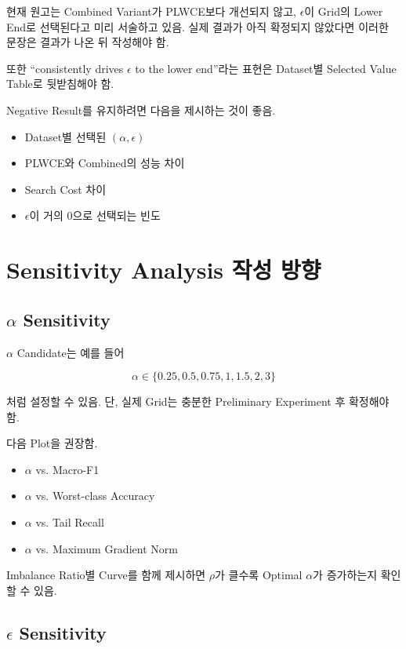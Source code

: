 \documentclass[11pt,a4paper]{article}
\begin{document}
현재 원고는 Combined Variant가 PLWCE보다 개선되지 않고, \(\epsilon\)이 Grid의 Lower End로 선택된다고 미리 서술하고 있음. 실제 결과가 아직 확정되지 않았다면 이러한 문장은 결과가 나온 뒤 작성해야 함.

또한 ``consistently drives \(\epsilon\) to the lower end''라는 표현은 Dataset별 Selected Value Table로 뒷받침해야 함.

Negative Result를 유지하려면 다음을 제시하는 것이 좋음.

\begin{itemize}
\item Dataset별 선택된 \((\alpha,\epsilon)\)
\item PLWCE와 Combined의 성능 차이
\item Search Cost 차이
\item \(\epsilon\)이 거의 \(0\)으로 선택되는 빈도
\end{itemize}

\section{Sensitivity Analysis 작성 방향}

\subsection{\(\alpha\) Sensitivity}

\(\alpha\) Candidate는 예를 들어

\[
\alpha\in\{0.25,0.5,0.75,1,1.5,2,3\}
\]

처럼 설정할 수 있음. 단, 실제 Grid는 충분한 Preliminary Experiment 후 확정해야 함.

다음 Plot을 권장함.

\begin{itemize}
\item \(\alpha\) vs. Macro-F1
\item \(\alpha\) vs. Worst-class Accuracy
\item \(\alpha\) vs. Tail Recall
\item \(\alpha\) vs. Maximum Gradient Norm
\end{itemize}

Imbalance Ratio별 Curve를 함께 제시하면 \(\rho\)가 클수록 Optimal \(\alpha\)가 증가하는지 확인할 수 있음.

\subsection{\(\epsilon\) Sensitivity}
\end{document}

